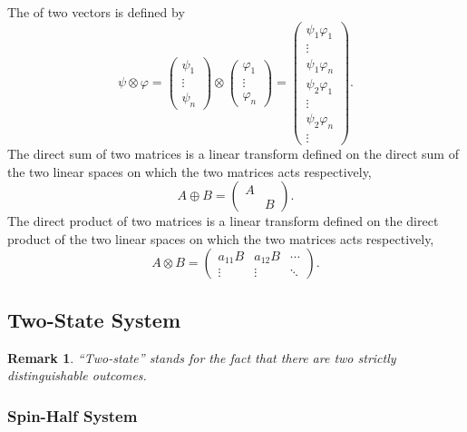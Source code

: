 \documentclass[hidelinks]{article}
\newtheorem{remark}{Remark}
\begin{document}
The  of two vectors is defined by
\[ \psi\otimes \varphi = \begin{pmatrix}
    \psi_1 \\ \vdots \\ \psi_n
\end{pmatrix} \otimes \begin{pmatrix}
    \varphi_1 \\ \vdots \\ \varphi_n
\end{pmatrix} = \begin{pmatrix}
    \psi_1 \varphi_1 \\
    \vdots \\
    \psi_1 \varphi_n \\
    \psi_2 \varphi_1 \\
    \vdots \\
    \psi_2 \varphi_n \\
    \vdots
\end{pmatrix}. \]
The direct sum of two matrices is a linear transform defined on the direct sum of the two linear spaces on which the two matrices acts respectively,
\[ A\oplus B = \begin{pmatrix}
    A & \\
    & B
\end{pmatrix}. \]
The direct product of two matrices is a linear transform defined on the direct product of the two linear spaces on which the two matrices acts respectively,
\[ A\otimes B = \begin{pmatrix}
    a_{11}B & a_{12}B & \cdots \\
    \vdots & \vdots & \ddots
\end{pmatrix}. \]


\subsection{Two-State System} %
\label{sub:two_state_system}

\begin{remark}
    ``Two-state'' stands for the fact that there are two strictly distinguishable outcomes.
\end{remark}

\subsubsection{Spin-Half System} %
\label{ssub:spin_half_system}
\end{document}
